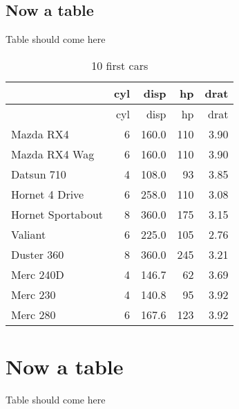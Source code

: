 \documentclass[]{article}
\begin{document}
\subsection{Now a table}\label{now-a-table-1}

Table should come here

\begin{longtable}[]{@{}lrrrr@{}}
\caption{10 first cars}\tabularnewline
\toprule
& cyl & disp & hp & drat\tabularnewline
\midrule
\endfirsthead
\toprule
& cyl & disp & hp & drat\tabularnewline
\midrule
\endhead
Mazda RX4 & 6 & 160.0 & 110 & 3.90\tabularnewline
Mazda RX4 Wag & 6 & 160.0 & 110 & 3.90\tabularnewline
Datsun 710 & 4 & 108.0 & 93 & 3.85\tabularnewline
Hornet 4 Drive & 6 & 258.0 & 110 & 3.08\tabularnewline
Hornet Sportabout & 8 & 360.0 & 175 & 3.15\tabularnewline
Valiant & 6 & 225.0 & 105 & 2.76\tabularnewline
Duster 360 & 8 & 360.0 & 245 & 3.21\tabularnewline
Merc 240D & 4 & 146.7 & 62 & 3.69\tabularnewline
Merc 230 & 4 & 140.8 & 95 & 3.92\tabularnewline
Merc 280 & 6 & 167.6 & 123 & 3.92\tabularnewline
\bottomrule
\end{longtable}

\lipsum

\section{Now a table}\label{now-a-table-2}

\lipsum

Table should come here
\end{document}
